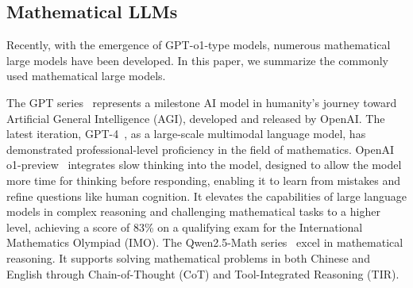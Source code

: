 
\subsection{Mathematical LLMs}
Recently, with the emergence of GPT-o1-type models, numerous mathematical large models have been developed. In this paper, we summarize the commonly used mathematical large models.

The GPT series~\cite{radford2019language,brown2020language,ouyang2022training} represents a milestone AI model in humanity's journey toward Artificial General Intelligence (AGI), developed and released by OpenAI. The latest iteration, GPT-4~\cite{achiam2023gpt}, as a large-scale multimodal language model, has demonstrated professional-level proficiency in the field of mathematics. 
OpenAI o1-preview~\cite{chatgpt} integrates slow thinking into the model, designed to allow the model more time for thinking before responding, enabling it to learn from mistakes and refine questions like human cognition. It elevates the capabilities of large language models in complex reasoning and challenging mathematical tasks to a higher level, achieving a score of 83\% on a qualifying exam for the International Mathematics Olympiad (IMO). The Qwen2.5-Math series~\cite{yang2024qwen2} excel in mathematical reasoning. It supports solving mathematical problems in both Chinese and English through Chain-of-Thought (CoT) and Tool-Integrated Reasoning (TIR). 

